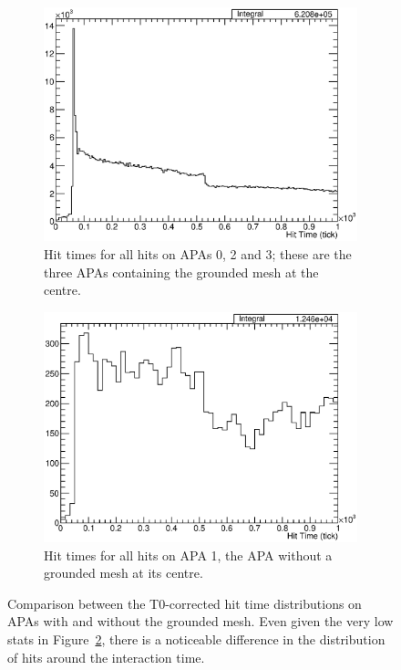 \begin{figure}
  \centering
  \begin{subfigure}[t]{0.48\linewidth}
    \centering
    \includegraphics[width=\textwidth]{HitTimesAPA023.eps}
    \caption{Hit times for all hits on APAs 0, 2 and 3; these are the three APAs containing the grounded mesh at the centre.}
    \label{fig:HitTimesAPA023}
  \end{subfigure}
  \hfill
  \begin{subfigure}[t]{0.48\linewidth}
    \centering
    \includegraphics[width=\textwidth]{HitTimesAPA1.eps}
    \caption{Hit times for all hits on APA 1, the APA without a grounded mesh at its centre.}
    \label{fig:HitTimesAPA1}
  \end{subfigure}
  \caption[Comparison between the T0-corrected hit time distributions on APAs with and without the grounded mesh.]{Comparison between the T0-corrected hit time distributions on APAs with and without the grounded mesh.  Even given the very low stats in Figure~\ref{fig:HitTimesAPA1}, there is a noticeable difference in the distribution of hits around the interaction time.}
  \label{fig:HitTimesAPAs}
\end{figure}


